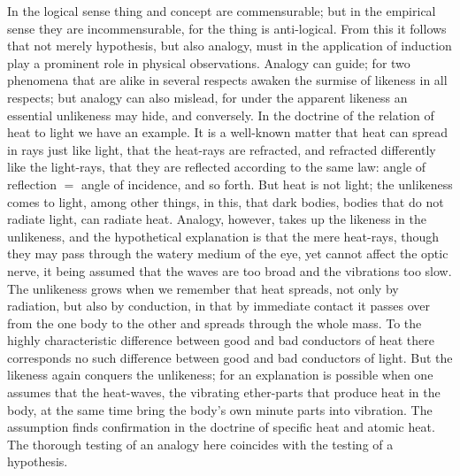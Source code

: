 \documentclass[12pt]{book}
\begin{document}
In the logical sense thing and concept are commensurable; but in the empirical sense
they are incommensurable, for the thing is anti-logical. From this it follows that not
merely hypothesis, but also analogy, must in the application of induction play a
prominent role in physical observations. Analogy can guide; for two phenomena that are
alike in several respects awaken the surmise of likeness in all respects; but analogy
can also mislead, for under the apparent likeness an essential unlikeness may hide,
and conversely. In the doctrine of the relation of heat to light we have an example. It
is a well-known matter that heat can spread in rays just like light, that the
heat-rays are refracted, and refracted differently like the light-rays, that they are
reflected according to the same law: angle of reflection $=$ angle of incidence, and so
forth. But heat is not light; the unlikeness comes to light, among other things, in
this, that dark bodies, bodies that do not radiate light, can radiate heat. Analogy,
however, takes up the likeness in the unlikeness, and the hypothetical explanation is
that the mere heat-rays, though they may pass through the watery medium of the eye, yet
cannot affect the optic nerve, it being assumed that the waves are too broad and the
vibrations too slow. The unlikeness grows when we remember that heat spreads, not only
by radiation, but also by conduction, in that by immediate contact it passes over from
the one body to the other and spreads through the whole mass. To the highly
characteristic difference between good and bad conductors of heat there corresponds no
such difference between good and bad conductors of light. But the likeness again
conquers the unlikeness; for an explanation is possible when one assumes that the
heat-waves, the vibrating ether-parts that produce heat in the body, at the same time
bring the body's own minute parts into vibration. The assumption finds confirmation in
the doctrine of specific heat and atomic heat. The thorough testing of an analogy here
coincides with the testing of a hypothesis.
\end{document}
